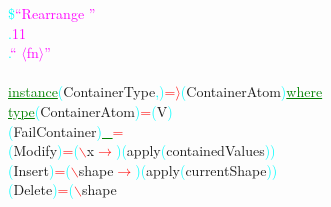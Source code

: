 \textcolor{cyan}{\$}\hsspace \textcolor{magenta}{``Rearrange ''}\\\hstab \hstab \textcolor{cyan}{.}\hsspace \textcolor{magenta}{11}\\\hstab \hstab \textcolor{cyan}{.}\hsspace \textcolor{magenta}{`` \ensuremath{\langle}fn\ensuremath{\rangle}''}\\\\\textcolor{green}{\underline{instance}}\hsspace \textcolor{cyan}{(}{\rm{}ContainerType}\textcolor{cyan}{,}\textcolor{cyan}{)}\hsspace \textcolor{red}{=\ensuremath{\rangle}}\hsspace \textcolor{cyan}{(}{\rm{}ContainerAtom}\textcolor{cyan}{)}\hsspace \textcolor{green}{\underline{where}}\\\hstab \textcolor{green}{\underline{type}}\hsspace \textcolor{cyan}{(}{\rm{}ContainerAtom}\textcolor{cyan}{)}\hsspace \textcolor{red}{=}\hsspace \textcolor{cyan}{(}{\rm{}V}\textcolor{cyan}{)}\\\hsspace \textcolor{cyan}{(}{\rm{}FailContainer}\hsspace \textcolor{cyan}{)}\hsspace \textcolor{green}{\underline{\_}}\hsspace \textcolor{red}{=}\\\hsspace \textcolor{cyan}{(}{\rm{}Modify}\hsspace \hsspace \hsspace {}\textcolor{cyan}{)}\hsspace \textcolor{red}{=}\hsspace \textcolor{cyan}{(}\textcolor{red}{$\backslash$}{\rm{}x}\hsspace \textcolor{red}{\ensuremath{\rightarrow}}\textcolor{cyan}{)}\hsspace \hsspace \hsspace \hsspace \hsspace \hsspace \hsspace \hsspace \hsspace \hsspace \hsspace \hsspace \hsspace \textcolor{cyan}{(}{\rm{}apply}\hsspace \textcolor{cyan}{(}{\rm{}containedValues}\textcolor{cyan}{)}\textcolor{cyan}{)}\\\hsspace \textcolor{cyan}{(}{\rm{}Insert}\hsspace \hsspace \hsspace {}\hsspace \hsspace \textcolor{cyan}{)}\hsspace \textcolor{red}{=}\hsspace \textcolor{cyan}{(}\textcolor{red}{$\backslash$}{\rm{}shape}\hsspace \textcolor{red}{\ensuremath{\rightarrow}}\hsspace \hsspace \hsspace {}\textcolor{cyan}{)}\hsspace \textcolor{cyan}{(}{\rm{}apply}\hsspace \textcolor{cyan}{(}{\rm{}currentShape}\hsspace \hsspace \hsspace {}\hsspace \hsspace \textcolor{cyan}{)}\textcolor{cyan}{)}\\\hsspace \textcolor{cyan}{(}{\rm{}Delete}\hsspace \hsspace \hsspace {}\hsspace \hsspace \textcolor{cyan}{)}\hsspace \textcolor{red}{=}\hsspace \textcolor{cyan}{(}\textcolor{red}{$\backslash$}{\rm{}shape}\hsspace 
